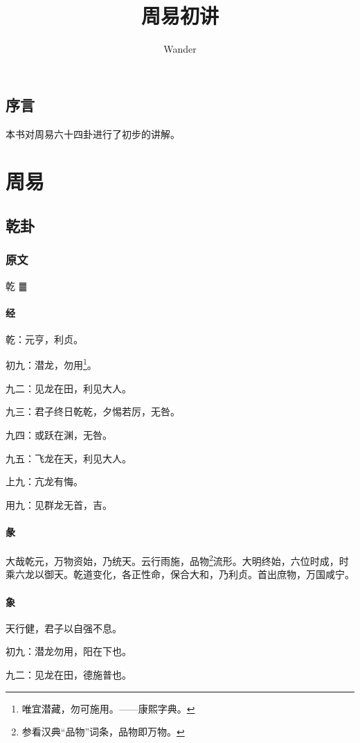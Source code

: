 \documentclass[12pt,oneside]{book}
\title{周易初讲}
\author{Wander}
\begin{document}



\frontmatter 
{}
\chapter*{序言}
本书对周易六十四卦进行了初步的讲解。


\setcounter{tocdepth}{2}    
\tableofcontents




\mainmatter
\part{周易}
\chapter{乾卦}
\section{原文}
乾  {\Large ䷀}


\subsection{经}
乾：元亨，利贞。

初九：潜龙，勿用\footnote{唯宜潜藏，勿可施用。——康熙字典。}。

九二：见龙在田，利见大人。

九三：君子终日乾乾，夕惕若厉，无咎。

九四：或跃在渊，无咎。

九五：飞龙在天，利见大人。

上九：亢龙有悔。

用九：见群龙无首，吉。


\subsection{彖}
大哉乾元，万物资始，乃统天。云行雨施，品物\footnote{参看汉典“品物”词条，品物即万物。}流形。大明终始，六位时成，时乘六龙以御天。乾道变化，各正性命，保合大和，乃利贞。首出庶物，万国咸宁。

\subsection{象}
天行健，君子以自强不息。

初九：潜龙勿用，阳在下也。

九二：见龙在田，德施普也。
\end{document}
